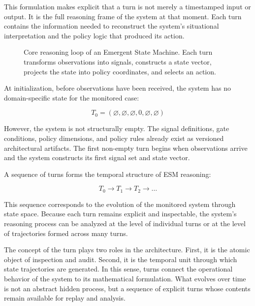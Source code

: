 \documentclass[11pt]{article}
\begin{document}
This formulation makes explicit that a turn is not merely a timestamped input or output. It is the full reasoning frame of the system at that moment. Each turn contains the information needed to reconstruct the system’s situational interpretation and the policy logic that produced its action.

\begin{figure}[H]
\centering

\caption{Core reasoning loop of an Emergent State Machine. Each turn transforms observations into signals, constructs a state vector, projects the state into policy coordinates, and selects an action.}
\label{fig:esm-core-loop}
\end{figure}

At initialization, before observations have been received, the system has no domain-specific state for the monitored case:

\begin{equation}
T_0 = (\varnothing, \varnothing, \varnothing, 0, \varnothing, \varnothing)
\end{equation}

However, the system is not structurally empty. The signal definitions, gate conditions, policy dimensions, and policy rules already exist as versioned architectural artifacts. The first non-empty turn begins when observations arrive and the system constructs its first signal set and state vector.

A sequence of turns forms the temporal structure of ESM reasoning:

\begin{equation}
T_0 \rightarrow T_1 \rightarrow T_2 \rightarrow \dots
\end{equation}

This sequence corresponds to the evolution of the monitored system through state space. Because each turn remains explicit and inspectable, the system’s reasoning process can be analyzed at the level of individual turns or at the level of trajectories formed across many turns.

The concept of the turn plays two roles in the architecture. First, it is the atomic object of inspection and audit. Second, it is the temporal unit through which state trajectories are generated. In this sense, turns connect the operational behavior of the system to its mathematical formulation. What evolves over time is not an abstract hidden process, but a sequence of explicit turns whose contents remain available for replay and analysis.
\end{document}
